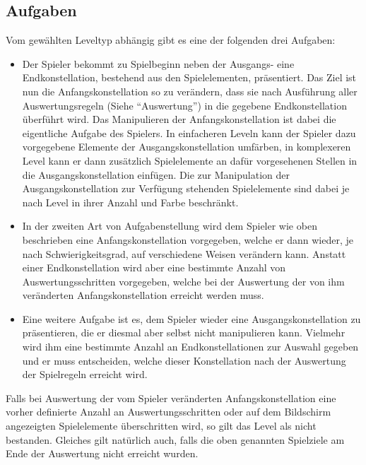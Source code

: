 \subsection{Aufgaben}
Vom gewählten Leveltyp abhängig gibt es eine der folgenden drei Aufgaben:
        \begin{itemize}
                \item Der Spieler bekommt zu Spielbeginn neben der Ausgangs- eine Endkonstellation, bestehend aus den Spielelementen, präsentiert.
                Das Ziel ist nun die Anfangskonstellation so zu verändern, dass sie nach Ausführung aller Auswertungsregeln (Siehe "`Auswertung"') in die gegebene Endkonstellation überführt wird.
                Das Manipulieren der Anfangskonstellation ist dabei die eigentliche Aufgabe des Spielers.
                In einfacheren Leveln kann der Spieler dazu vorgegebene Elemente der Ausgangskonstellation umfärben, in komplexeren Level kann er dann zusätzlich Spielelemente an dafür vorgesehenen Stellen in die Ausgangskonstellation einfügen. 
                Die zur Manipulation der Ausgangskonstellation zur Verfügung stehenden Spielelemente sind dabei je nach Level in ihrer Anzahl und Farbe beschränkt.

                \item In der zweiten Art von Aufgabenstellung wird dem Spieler wie oben beschrieben eine Anfangskonstellation vorgegeben, welche er dann wieder, je nach Schwierigkeitsgrad, auf verschiedene Weisen verändern kann.
                Anstatt einer Endkonstellation wird aber eine bestimmte Anzahl von Auswertungsschritten vorgegeben, welche bei der Auswertung der von ihm veränderten Anfangskonstellation erreicht werden muss.

                \item Eine weitere Aufgabe ist es, dem Spieler wieder eine Ausgangskonstellation zu präsentieren, die er diesmal aber selbst nicht manipulieren kann. 
                Vielmehr wird ihm eine bestimmte Anzahl an Endkonstellationen zur Auswahl gegeben und er muss entscheiden, welche dieser Konstellation nach der Auswertung der Spielregeln erreicht wird.

        \end{itemize}

        Falls bei Auswertung der vom Spieler veränderten Anfangskonstellation eine vorher definierte Anzahl an Auswertungsschritten oder auf dem Bildschirm angezeigten Spielelemente überschritten wird, so gilt das Level als nicht bestanden. 
        Gleiches gilt natürlich auch, falls die oben genannten Spielziele am Ende der Auswertung nicht erreicht wurden.
        
